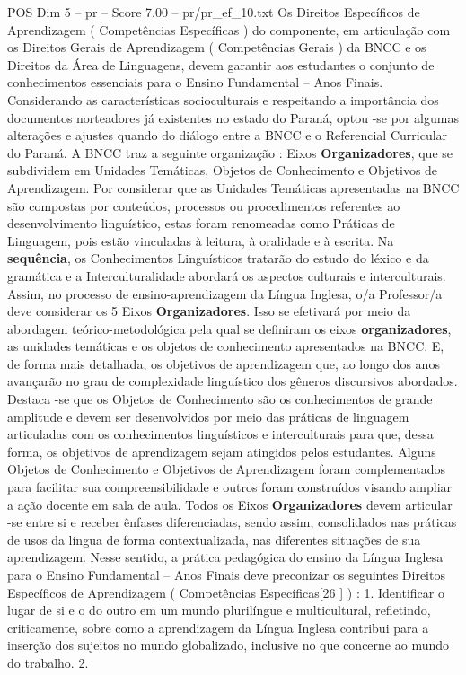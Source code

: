 \begin{textsample}{POS Dim 5 – pr – Score 7.00 – pr/pr\_ef\_10.txt}
Os Direitos Específicos de Aprendizagem ( Competências Específicas ) do componente, em articulação com os Direitos Gerais de Aprendizagem ( Competências Gerais ) da BNCC e os Direitos da Área de Linguagens, devem garantir aos estudantes o conjunto de conhecimentos essenciais para o Ensino Fundamental – Anos Finais.
Considerando as características socioculturais e respeitando a importância dos documentos norteadores já existentes no estado do Paraná, optou -se por algumas alterações e ajustes quando do diálogo entre a BNCC e o Referencial Curricular do Paraná.
A BNCC traz a seguinte organização : Eixos \textbf{Organizadores}, que se subdividem em Unidades Temáticas, Objetos de Conhecimento e Objetivos de Aprendizagem.
Por considerar que as Unidades Temáticas apresentadas na BNCC são compostas por conteúdos, processos ou procedimentos referentes ao desenvolvimento linguístico, estas foram renomeadas como Práticas de Linguagem, pois estão vinculadas à leitura, à oralidade e à escrita.
Na \textbf{sequência}, os Conhecimentos Linguísticos tratarão do estudo do léxico e da gramática e a Interculturalidade abordará os aspectos culturais e interculturais.
Assim, no processo de ensino-aprendizagem da Língua Inglesa, o/a Professor/a deve considerar os 5 Eixos \textbf{Organizadores}.
Isso se efetivará por meio da abordagem teórico-metodológica pela qual se definiram os eixos \textbf{organizadores}, as unidades temáticas e os objetos de conhecimento apresentados na BNCC.
E, de forma mais detalhada, os objetivos de aprendizagem que, ao longo dos anos avançarão no grau de complexidade linguístico dos gêneros discursivos abordados.
Destaca -se que os Objetos de Conhecimento são os conhecimentos de grande amplitude e devem ser desenvolvidos por meio das práticas de linguagem articuladas com os conhecimentos linguísticos e interculturais para que, dessa forma, os objetivos de aprendizagem sejam atingidos pelos estudantes.
Alguns Objetos de Conhecimento e Objetivos de Aprendizagem foram complementados para facilitar sua compreensibilidade e outros foram construídos visando ampliar a ação docente em sala de aula.
Todos os Eixos \textbf{Organizadores} devem articular -se entre si e receber ênfases diferenciadas, sendo assim, consolidados nas práticas de usos da língua de forma contextualizada, nas diferentes situações de sua aprendizagem.
Nesse sentido, a prática pedagógica do ensino da Língua Inglesa para o Ensino Fundamental – Anos Finais deve preconizar os seguintes Direitos Específicos de Aprendizagem ( Competências Específicas[26 ] ) : 1.
Identificar o lugar de si e o do outro em um mundo plurilíngue e multicultural, refletindo, criticamente, sobre como a aprendizagem da Língua Inglesa contribui para a inserção dos sujeitos no mundo globalizado, inclusive no que concerne ao mundo do trabalho. 2.

\end{textsample}
